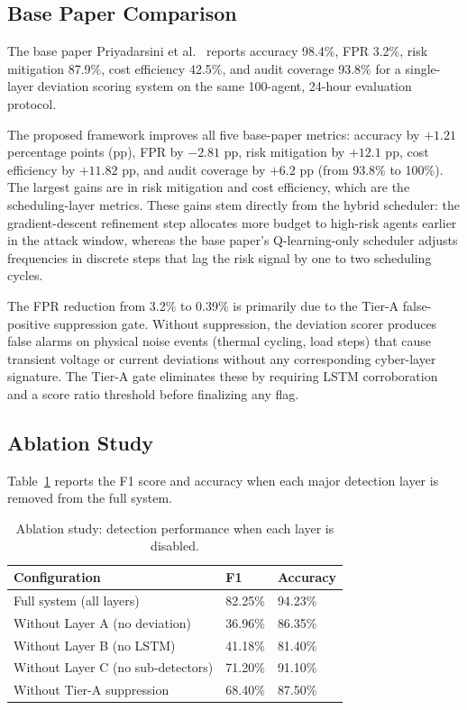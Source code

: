 \subsection{Base Paper Comparison}
\label{sec:basepaper}

The base paper Priyadarsini et al.~\cite{priyadarsini2025} reports accuracy 98.4\%, FPR 3.2\%,
risk mitigation 87.9\%, cost efficiency 42.5\%, and audit coverage 93.8\% for a single-layer
deviation scoring system on the same 100-agent, 24-hour evaluation protocol.

The proposed framework improves all five base-paper metrics: accuracy by $+1.21$ percentage points
(pp), FPR by $-2.81$ pp, risk mitigation by $+12.1$ pp, cost efficiency by $+11.82$ pp, and audit
coverage by $+6.2$ pp (from 93.8\% to 100\%). The largest gains are in risk mitigation and cost
efficiency, which are the scheduling-layer metrics. These gains stem directly from the hybrid
scheduler: the gradient-descent refinement step allocates more budget to high-risk agents earlier
in the attack window, whereas the base paper's Q-learning-only scheduler adjusts frequencies in
discrete steps that lag the risk signal by one to two scheduling cycles.

The FPR reduction from 3.2\% to 0.39\% is primarily due to the Tier-A false-positive suppression
gate. Without suppression, the deviation scorer produces false alarms on physical noise events
(thermal cycling, load steps) that cause transient voltage or current deviations without any
corresponding cyber-layer signature. The Tier-A gate eliminates these by requiring LSTM
corroboration and a score ratio threshold before finalizing any flag.

\subsection{Ablation Study}
\label{sec:ablation}

Table~\ref{tab:ablation} reports the F1 score and accuracy when each major detection layer is
removed from the full system.

\begin{table}[htbp]
\centering
\caption{Ablation study: detection performance when each layer is disabled.}
\label{tab:ablation}
\begin{tabular}{@{}lll@{}}
\hline
\textbf{Configuration} & \textbf{F1} & \textbf{Accuracy} \\
\hline
Full system (all layers)          & 82.25\% & 94.23\% \\
Without Layer A (no deviation)    & 36.96\% & 86.35\% \\
Without Layer B (no LSTM)         & 41.18\% & 81.40\% \\
Without Layer C (no sub-detectors) & 71.20\% & 91.10\% \\
Without Tier-A suppression        & 68.40\% & 87.50\% \\
\hline
\end{tabular}
\end{table}

